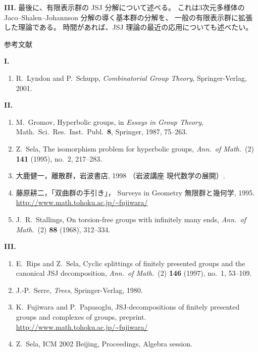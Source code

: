 \documentclass[uplatex,dvipdfmx]{jlreq}
\begin{document}
\medskip
\noindent\textbf{III.}\quad
最後に、有限表示群の JSJ 分解について述べる。
これは3次元多様体の Jaco--Shalen--Johannson 分解の導く基本群の分解を、
一般の有限表示群に拡張した理論である。
時間があれば、JSJ 理論の最近の応用についても述べたい。

\vspace{6pt}

\begin{center}
  \textsc{参考文献}
\end{center}

\noindent\textbf{I.}
\begin{enumerate}
  \item[{[LSc]}] R.~Lyndon and P.~Schupp,
        \textit{Combinatorial Group Theory},
        Springer-Verlag, 2001.
\end{enumerate}

\noindent\textbf{II.}
\begin{enumerate}
  \item[{[G]}] M.~Gromov,
        Hyperbolic groups,
        in \textit{Essays in Group Theory},
        Math.~Sci.~Res.~Inst.~Publ.~\textbf{8},
        Springer, 1987, 75--263.
  \item[{[S]}] Z.~Sela,
        The isomorphism problem for hyperbolic groups,
        \textit{Ann.~of Math.}~(2) \textbf{141} (1995), no.~2, 217--283.
  \item[{[O]}] 大鹿健一，離散群，岩波書店, 1998
               （岩波講座 現代数学の展開）.
  \item[{[F]}] 藤原耕二，「双曲群の手引き」，
               Surveys in Geometry 無限群と幾何学, 1995.\\
               \url{http://www.math.tohoku.ac.jp/~fujiwara/}
  \item[{[St]}] J.~R.~Stallings,
        On torsion-free groups with infinitely many ends,
        \textit{Ann.~of Math.}~(2) \textbf{88} (1968), 312--334.
\end{enumerate}

\noindent\textbf{III.}
\begin{enumerate}
  \item[{[RS]}] E.~Rips and Z.~Sela,
        Cyclic splittings of finitely presented groups and
        the canonical JSJ decomposition,
        \textit{Ann.~of Math.}~(2) \textbf{146} (1997), no.~1, 53--109.
  \item[{[Se]}] J.-P.~Serre,
        \textit{Trees},
        Springer-Verlag, 1980.
  \item[{[FP]}] K.~Fujiwara and P.~Papasoglu,
        JSJ-decompositions of finitely presented groups and complexes of groups,
        preprint.\\
        \url{http://www.math.tohoku.ac.jp/~fujiwara/}
  \item[{[S2]}] Z.~Sela,
        ICM 2002 Beijing, Proceedings, Algebra session.
\end{enumerate}
\end{document}
